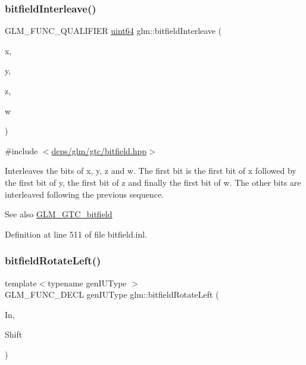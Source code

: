 \subsubsection{\texorpdfstring{bitfield\+Interleave()}{bitfieldInterleave()}\hspace{0.1cm}{\footnotesize\ttfamily [16/16]}}
{\footnotesize\ttfamily G\+L\+M\+\_\+\+F\+U\+N\+C\+\_\+\+Q\+U\+A\+L\+I\+F\+I\+ER \hyperlink{group__gtc__type__precision_gae3632bf9b37da66233d78930dd06378a}{uint64} glm\+::bitfield\+Interleave (\begin{DoxyParamCaption}\item[{\hyperlink{group__gtc__type__precision_gad8c2939e1fdd8e5828b31d95c52255d5}{uint16}}]{x,  }\item[{\hyperlink{group__gtc__type__precision_gad8c2939e1fdd8e5828b31d95c52255d5}{uint16}}]{y,  }\item[{\hyperlink{group__gtc__type__precision_gad8c2939e1fdd8e5828b31d95c52255d5}{uint16}}]{z,  }\item[{\hyperlink{group__gtc__type__precision_gad8c2939e1fdd8e5828b31d95c52255d5}{uint16}}]{w }\end{DoxyParamCaption})}



{\ttfamily \#include $<$\hyperlink{bitfield_8hpp}{deps/glm/gtc/bitfield.\+hpp}$>$}

Interleaves the bits of x, y, z and w. The first bit is the first bit of x followed by the first bit of y, the first bit of z and finally the first bit of w. The other bits are interleaved following the previous sequence.

\begin{DoxySeeAlso}{See also}
\hyperlink{group__gtc__bitfield}{G\+L\+M\+\_\+\+G\+T\+C\+\_\+bitfield} 
\end{DoxySeeAlso}


Definition at line 511 of file bitfield.\+inl.

\mbox{\label{group__gtc__bitfield_ga2eb49678a344ce1495bdb5586d9896b9}} 
\subsubsection{\texorpdfstring{bitfield\+Rotate\+Left()}{bitfieldRotateLeft()}\hspace{0.1cm}{\footnotesize\ttfamily [1/2]}}
{\footnotesize\ttfamily template$<$typename gen\+I\+U\+Type $>$ \\
G\+L\+M\+\_\+\+F\+U\+N\+C\+\_\+\+D\+E\+CL gen\+I\+U\+Type glm\+::bitfield\+Rotate\+Left (\begin{DoxyParamCaption}\item[{gen\+I\+U\+Type}]{In,  }\item[{int}]{Shift }\end{DoxyParamCaption})}




